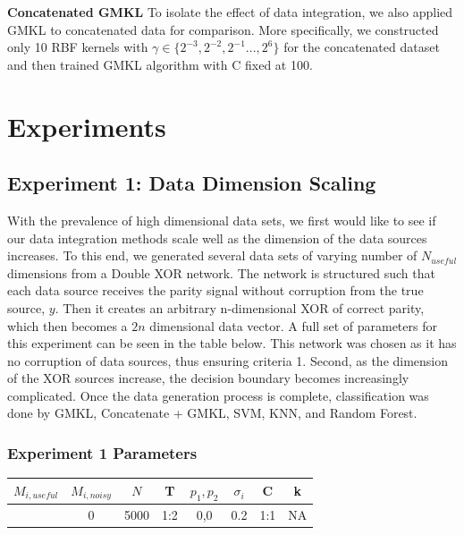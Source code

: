 \documentclass{article}
\begin{document}
\textbf{Concatenated GMKL}
To isolate the effect of data integration, we also applied GMKL to concatenated data for comparison. More specifically, we constructed only 10 RBF kernels with $\gamma \in \{2^{-3}, 2^{-2}, 2^{-1} ..., 2^{6}\}$ for the concatenated dataset and then trained GMKL algorithm with C fixed at 100.\\













\section*{Experiments}



\subsection*{Experiment 1: Data Dimension Scaling}
With the prevalence of high dimensional data sets, we first would like to see
if our data integration methods scale well as the dimension of the data sources
increases. To this end, we generated several data sets of varying number of
$N_{useful}$ dimensions from a Double XOR network. The network is
structured such that each data source receives the parity signal without
corruption from the true source, $y$. Then it creates an arbitrary n-dimensional
XOR of correct parity, which then becomes a $2n$ dimensional data vector.  A full
set of parameters for this experiment can be seen in the table below. This network was
chosen as it has no corruption of data sources, thus ensuring criteria 1.
Second, as the dimension of the XOR sources increase, the decision boundary becomes
increasingly complicated. Once the data generation process is complete,
classification was done by GMKL, Concatenate + GMKL, SVM, KNN, and Random
Forest.

\subsubsection*{Experiment 1 Parameters}
\begin{center}
\begin{tabular}{|c|c|c|c|c|c|c|c|}
\hline
$M_{i,useful}$ & $M_{i, noisy}$ & $N$ & T &  $p_1, p_2$ & $\sigma_i$ & C &  k  \\
\hline
[2,3,4,5,6,7] & 0 & 5000 & 1:2 & 0,0 & 0.2 & 1:1 & NA  \\
\hline
\end{tabular}
\end{center}
\end{document}
